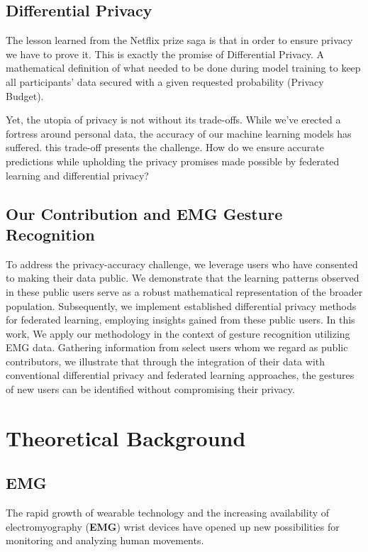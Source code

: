 \documentclass[fourier]{_style/dissertation}
\begin{document}
\section{Differential Privacy}

The lesson learned from the Netflix prize saga is that in order to ensure privacy we have to prove it. This is exactly the promise of Differential Privacy. A mathematical definition of what needed to be done during model training to keep all participants' data secured  with a given requested probability (Privacy Budget).

Yet, the utopia of privacy is not without its trade-offs. While we've erected a fortress around personal data, the accuracy of our machine learning models has suffered. this trade-off presents the challenge. How do we ensure accurate predictions while upholding the privacy promises made possible by federated learning and differential privacy?

\section{Our Contribution and EMG Gesture Recognition}
To address the privacy-accuracy challenge, we leverage users who have consented to making their data public. We demonstrate that the learning patterns observed in these public users serve as a robust mathematical representation of the broader population. Subsequently, we implement established differential privacy methods for federated learning, employing insights gained from these public users.
In this work, We apply our methodology in the context of gesture recognition utilizing EMG data. Gathering information from select users whom we regard as public contributors, we illustrate that through the integration of their data with conventional differential privacy and federated learning approaches, the gestures of new users can be identified without compromising their privacy.

\chapter{Theoretical Background}
\section{EMG}
The rapid growth of wearable technology and the increasing availability of electromyography (\textbf{EMG}) wrist devices have opened up new possibilities for monitoring and analyzing human movements. \\
\end{document}
